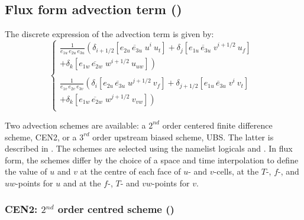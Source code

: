 \documentclass[../main/NEMO_manual]{subfiles}
\begin{document}
\subsection{Flux form advection term (\protect{}) }
\label{subsec:DYN_adv_flux}

The discrete expression of the advection term is given by:
\[
  \left\{
    \begin{aligned}
      \frac{1}{e_{1u}\,e_{2u}\,e_{3u}}
      \left(      \delta_{i+1/2} \left[ \overline{e_{2u}\,e_{3u}\;u }^{i       }  \ u_t      \right]
        + \delta_{j       } \left[ \overline{e_{1u}\,e_{3u}\;v }^{i+1/2}  \ u_f      \right] \right.  \ \;   \\
      \left.   + \delta_{k      } \left[ \overline{e_{1w}\,e_{2w}\;w}^{i+1/2}  \ u_{uw} \right] \right)   \\
      \\
      \frac{1}{e_{1v}\,e_{2v}\,e_{3v}}
      \left(     \delta_{i       } \left[ \overline{e_{2u}\,e_{3u }\;u }^{j+1/2} \ v_f       \right]
        + \delta_{j+1/2} \left[ \overline{e_{1u}\,e_{3u }\;v }^{i       } \ v_t       \right] \right.  \ \, \, \\
      \left.  + \delta_{k      } \left[ \overline{e_{1w}\,e_{2w}\;w}^{j+1/2} \ v_{vw}  \right] \right) \\
    \end{aligned}
  \right.
\]

Two advection schemes are available:
a $2^{nd}$ order centered finite difference scheme, CEN2,
or a $3^{rd}$ order upstream biased scheme, UBS.
The latter is described in \citet{Shchepetkin_McWilliams_OM05}.
The schemes are selected using the namelist logicals  and . 
In flux form, the schemes differ by the choice of a space and time interpolation to define the value of
$u$ and $v$ at the centre of each face of $u$- and $v$-cells, \ie at the $T$-, $f$-,
and $uw$-points for $u$ and at the $f$-, $T$- and $vw$-points for $v$. 

\subsubsection{CEN2: $2^{nd}$ order centred scheme (\protect{})}
\label{subsec:DYN_adv_cen2}
\end{document}
